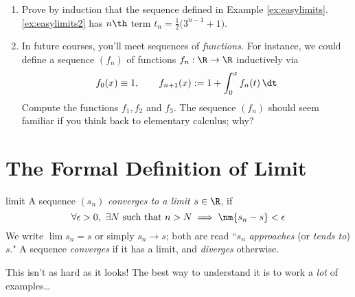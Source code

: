 \begin{exercisessec}{}{}
\begin{enumerate}
	  \item Prove by induction that the sequence defined in Example \ref*{ex:easylimits}.\ref{ex:easylimits2} has $n\th$ term $t_n=\frac 12\bigl(3^{n-1}+1\bigr)$.
	  
	  \item In future courses, you'll meet sequences of \emph{functions.} For instance,  we could define a sequence $(f_n)$ of functions $f_n:\R\to\R$ inductively via
	  \[f_0(x)\equiv 1,\qquad f_{n+1}(x):=1+\int_0^x f_n(t)\,\dt\]
	  Compute the functions $f_1,f_2$ and $f_3$. The sequence $(f_n)$ should seem familiar if you think back to elementary calculus; why?
	\end{enumerate}
\end{exercisessec}

\clearpage



\section{The Formal Definition of Limit}\label{sec:limitdef}


\begin{defn}{}{limit}
A sequence $(s_n)$ \emph{converges to a limit $s\in\R$}, if\footnotemark
\[\forall\epsilon>0,\ \exists N\ \text{such that}\ n>N\implies \nm{s_n-s}<\epsilon\]
We write $\lim s_n=s$ or simply $s_n\to s$; both are read ``$s_n$ \emph{approaches} (or \emph{tends to}) $s$."\smallbreak
A sequence \emph{converges} if it has a limit, and \emph{diverges} otherwise.
\end{defn}


This isn't as hard as it looks! The best way to understand it is to work a \emph{lot} of examples\ldots




